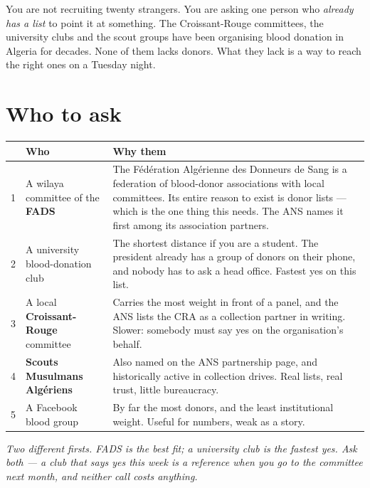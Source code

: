 \documentclass[11pt,a4paper]{article}
\newcommand{\note}[1]{{\small\color{qatraGrey}\textit{#1}}}
\begin{document}
You are not recruiting twenty strangers. You are asking one person who
\emph{already has a list} to point it at something. The Croissant-Rouge
committees, the university clubs and the scout groups have been organising
blood donation in Algeria for decades. None of them lacks donors. What they
lack is a way to reach the right ones on a Tuesday night.

\section{Who to ask}

\begin{center}
\begin{tabularx}{\textwidth}{@{}rlX@{}}
\toprule
& \textbf{Who} & \textbf{Why them} \\
\midrule
1 & A wilaya committee of the \textbf{FADS} &
The F\'ed\'eration Alg\'erienne des Donneurs de Sang is a federation of
blood-donor associations with local committees. Its entire reason to exist is
donor lists --- which is the one thing this needs. The ANS names it first among
its association partners. \\
2 & A university blood-donation club &
The shortest distance if you are a student. The president already has a group
of donors on their phone, and nobody has to ask a head office. Fastest yes on
this list. \\
3 & A local \textbf{Croissant-Rouge} committee &
Carries the most weight in front of a panel, and the ANS lists the CRA as a
collection partner in writing. Slower: somebody must say yes on the
organisation's behalf. \\
4 & \textbf{Scouts Musulmans Alg\'eriens} &
Also named on the ANS partnership page, and historically active in collection
drives. Real lists, real trust, little bureaucracy. \\
5 & A Facebook blood group &
By far the most donors, and the least institutional weight. Useful for numbers,
weak as a story. \\
\bottomrule
\end{tabularx}
\end{center}

\note{Two different firsts. FADS is the best \emph{fit}; a university club is
the fastest \emph{yes}. Ask both --- a club that says yes this week is a
reference when you go to the committee next month, and neither call costs
anything.}
\end{document}
